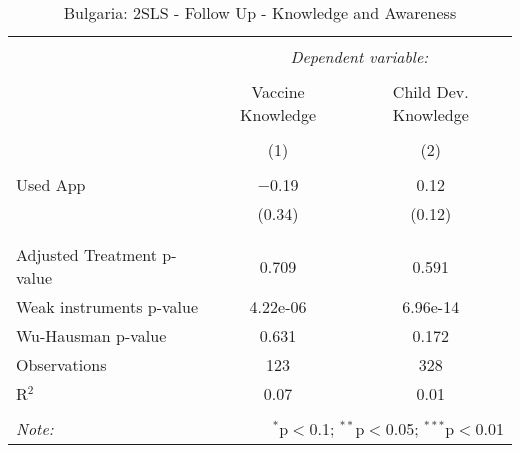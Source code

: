 
\begin{table}[!htbp] \centering 
  \caption{Bulgaria: 2SLS - Follow Up - Knowledge and Awareness} 
  \label{tbl:Bulgaria: 2SLS - Follow Up - Knowledge and Awareness} 
\begin{tabular}{@{\extracolsep{5pt}}lcc} 
\\[-1.8ex]\hline 
\hline \\[-1.8ex] 
 & \multicolumn{2}{c}{\textit{Dependent variable:}} \\ 
\cline{2-3} 
\\[-1.8ex] & Vaccine Knowledge & Child Dev. Knowledge \\ 
\\[-1.8ex] & (1) & (2)\\ 
\hline \\[-1.8ex] 
 Used App & $-$0.19 & 0.12 \\ 
  & (0.34) & (0.12) \\ 
  & & \\ 
\hline \\[-1.8ex] 
Adjusted Treatment p-value & 0.709 & 0.591 \\ 
Weak instruments p-value & 4.22e-06 & 6.96e-14 \\ 
Wu-Hausman p-value & 0.631 & 0.172 \\ 
Observations & 123 & 328 \\ 
R$^{2}$ & 0.07 & 0.01 \\ 
\hline 
\hline \\[-1.8ex] 
\textit{Note:}  & \multicolumn{2}{r}{$^{*}$p$<$0.1; $^{**}$p$<$0.05; $^{***}$p$<$0.01} \\ 
\end{tabular} 
\end{table} 
